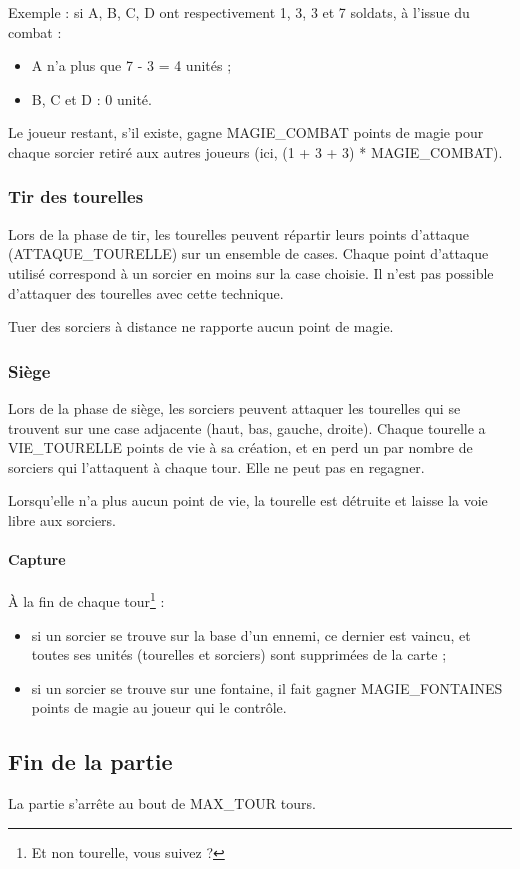 Exemple : si A, B, C, D ont respectivement 1, 3, 3 et 7 soldats, à
l'issue du combat :

\begin{itemize}
\itemsep1pt\parskip0pt
\item
  A n'a plus que 7 - 3 = 4 unités ;
\item
  B, C et D : 0 unité.
\end{itemize}

Le joueur restant, s'il existe, gagne MAGIE\_COMBAT points de magie
pour chaque sorcier retiré aux autres joueurs (ici, (1 + 3 + 3) *
MAGIE\_COMBAT).

\subsubsection{Tir des tourelles}\label{tir-des-tourelles}

Lors de la phase de tir, les tourelles peuvent répartir leurs points d'attaque (ATTAQUE\_TOURELLE) sur un ensemble de cases. Chaque
point d'attaque utilisé correspond à un sorcier en moins sur la case
choisie. Il n'est pas possible d'attaquer des tourelles avec cette
technique.

Tuer des sorciers à distance ne rapporte aucun point de magie.

\subsubsection{Siège}\label{siuxe8ge}

Lors de la phase de siège, les sorciers peuvent attaquer les tourelles
qui se trouvent sur une case adjacente (haut, bas, gauche, droite).
Chaque tourelle a VIE\_TOURELLE points de vie à sa création, et en
perd un par nombre de sorciers qui l'attaquent à chaque tour. Elle ne
peut pas en regagner.

Lorsqu'elle n'a plus aucun point de vie, la tourelle est détruite et
laisse la voie libre aux sorciers.

\paragraph{Capture}\label{capture}

À la fin de chaque tour\footnote{Et non tourelle, vous suivez ?} :

\begin{itemize}
\itemsep1pt\parskip0pt
\item
  si un sorcier se trouve sur la base d'un ennemi, ce dernier est vaincu, et
  toutes ses unités (tourelles et sorciers) sont supprimées de la carte ;
\item
  si un sorcier se trouve sur une fontaine, il fait gagner MAGIE\_FONTAINES
  points de magie au joueur qui le contrôle.
\end{itemize}

\subsection{Fin de la partie}\label{fin-de-la-partie}

La partie s'arrête au bout de MAX\_TOUR tours.
